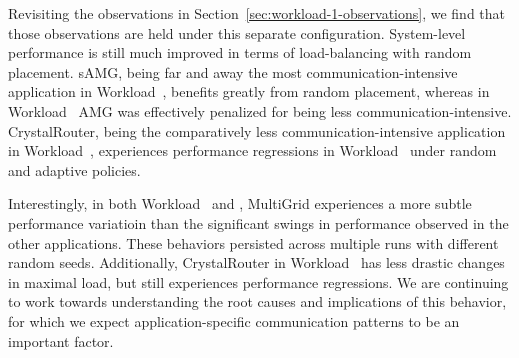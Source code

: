 
Revisiting the observations in Section~\ref{sec:workload-1-observations}, we
find that those observations are held under this separate configuration.
System-level performance is still much improved in terms of load-balancing with random placement.
sAMG, being far and away the most communication-intensive application in Workload~, benefits
greatly from random placement, whereas in Workload~ AMG was effectively
penalized for being less communication-intensive. CrystalRouter, being the
comparatively less communication-intensive application in Workload~,
experiences performance regressions in Workload~ under random and adaptive
policies.

Interestingly, in both Workload~ and , MultiGrid experiences
a more subtle performance variatioin than the significant swings in performance
observed in the other applications. These behaviors persisted across multiple runs
with different random seeds. Additionally, CrystalRouter in Workload~
has less drastic changes in maximal load, but still experiences performance
regressions. We are continuing to work towards understanding the root causes
and implications of this behavior, for which we expect application-specific
communication patterns to be an important factor. 
